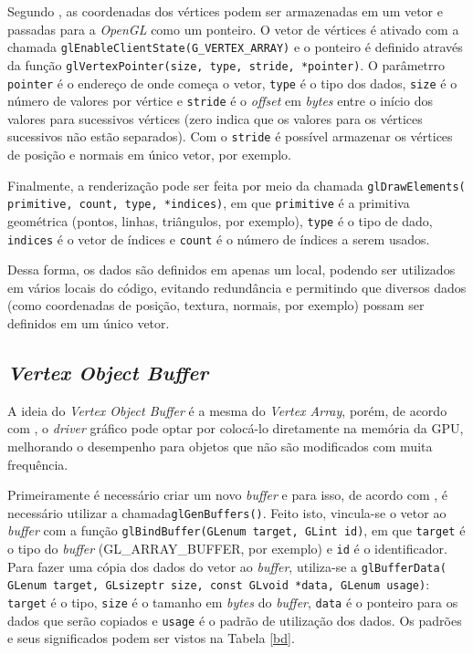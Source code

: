 	Segundo  \cite{guha2011}, as coordenadas dos vértices podem ser armazenadas em um vetor e passadas para a \textit{OpenGL} como um ponteiro. O vetor de vértices é ativado com a chamada \texttt{glEnableClientState(G\_VERTEX\_ARRAY)} e o ponteiro é definido através da função \texttt{glVertexPointer(size, type, stride, *pointer)}. O parâmetrro \texttt{pointer} é o endereço de onde começa o vetor, \texttt{type} é o tipo dos dados, \texttt{size} é o número de valores por vértice e \texttt{stride} é o \textit{offset} em \textit{bytes} entre o início dos valores para sucessivos vértices (zero indica que os valores para os vértices sucessivos não estão separados). Com o \texttt{stride} é possível armazenar os vértices de posição e normais em único vetor, por exemplo. 

	Finalmente, a renderização pode ser feita por meio da chamada \texttt{glDrawElements( primitive, count, type, *indices)}, em que \texttt{primitive} é a primitiva geométrica (pontos, linhas, triângulos, por exemplo), \texttt{type} é o tipo de dado, \texttt{indices} é o vetor de índices e \texttt{count} é o número de índices a serem usados. 

	Dessa forma, os dados são definidos em apenas um local, podendo ser utilizados em vários locais do código, evitando redundância e permitindo que diversos dados (como coordenadas de posição, textura, normais, por exemplo) possam ser definidos em um único vetor.     

\subsection{\textit{Vertex Object Buffer}}	
 \label{tecvertbuf}

	A ideia do \textit{Vertex Object Buffer} é a mesma do \textit{Vertex Array}, porém, de acordo com \cite{vbo}, o \textit{driver} gráfico pode optar por colocá-lo diretamente na memória da GPU, melhorando o desempenho para objetos que não são modificados com muita frequência. 

	Primeiramente é necessário criar um novo \textit{buffer} e para isso, de acordo com \cite{interactive2012}, é necessário utilizar a chamada\texttt{glGenBuffers()}. Feito isto, vincula-se o vetor ao \textit{buffer} com a função \texttt{glBindBuffer(GLenum  target, GLint id)}, em que \texttt{target} é o tipo do \textit{buffer} (GL\_ARRAY\_BUFFER, por exemplo) e \texttt{id} é o identificador. Para fazer uma cópia dos dados do vetor ao \textit{buffer}, utiliza-se a \texttt{glBufferData( GLenum target, GLsizeptr size, const GLvoid *data, GLenum usage)}: \texttt{target} é o tipo, \texttt{size} é o tamanho em \textit{bytes} do \textit{buffer}, \texttt{data} é o ponteiro para os dados que serão copiados e \texttt{usage} é o padrão de utilização dos dados. Os padrões e seus significados podem ser vistos na Tabela \ref{bd}.

